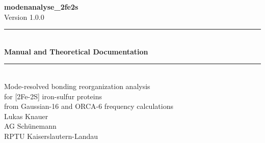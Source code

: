 \documentclass[11pt,a4paper,twoside]{article}
\theoremstyle{remark}
\begin{document}
\begin{titlepage}
  \begin{center}
    \vspace*{2cm}
    {\Huge\bfseries\color{accent} modenanalyse\_2fe2s}\\[0.4cm]
    {\large Version 1.0.0}\\[2cm]

    \rule{\textwidth}{0.4pt}\\[0.3cm]
    {\LARGE\bfseries Manual and Theoretical Documentation}\\[0.3cm]
    \rule{\textwidth}{0.4pt}\\[1cm]

    {\large
      Mode-resolved bonding reorganization analysis\\
      for {[}2Fe-2S{]} iron-sulfur proteins\\
      from Gaussian-16 and ORCA-6 frequency calculations
    }\\[1.5cm]

    {\large
      Lukas Knauer\\
      AG Sch\"unemann\\
      RPTU Kaiserslautern-Landau
    }\\[1.5cm]


\end{center}
\end{titlepage}
\end{document}
